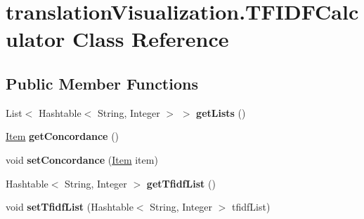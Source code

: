 \hypertarget{classtranslation_visualization_1_1_t_f_i_d_f_calculator}{}\section{translation\+Visualization.\+T\+F\+I\+D\+F\+Calculator Class Reference}
\label{classtranslation_visualization_1_1_t_f_i_d_f_calculator}
\subsection*{Public Member Functions}
\begin{DoxyCompactItemize}
\item 
\mbox{\label{classtranslation_visualization_1_1_t_f_i_d_f_calculator_a1881598c99aeace13b7922c69edda980}} 
List$<$ Hashtable$<$ String, Integer $>$ $>$ {\bfseries get\+Lists} ()
\item 
\mbox{\label{classtranslation_visualization_1_1_t_f_i_d_f_calculator_aeeeb099a394fb2cb7c935c9f544bd303}} 
\hyperlink{classtranslation_visualization_1_1_item}{Item} {\bfseries get\+Concordance} ()
\item 
\mbox{\label{classtranslation_visualization_1_1_t_f_i_d_f_calculator_ac16eeafdf9eb60f960a3a09c10368d0a}} 
void {\bfseries set\+Concordance} (\hyperlink{classtranslation_visualization_1_1_item}{Item} item)
\item 
\mbox{\label{classtranslation_visualization_1_1_t_f_i_d_f_calculator_a284d7de1902d3fef52c11e448c08dd8e}} 
Hashtable$<$ String, Integer $>$ {\bfseries get\+Tfidf\+List} ()
\item 
\mbox{\label{classtranslation_visualization_1_1_t_f_i_d_f_calculator_a79ac5963ad3479bfcccfcbf5f07ab45b}} 
void {\bfseries set\+Tfidf\+List} (Hashtable$<$ String, Integer $>$ tfidf\+List)
\item 
\mbox{\label{classtranslation_visualization_1_1_t_f_i_d_f_calculator_a3f779c17eab4b2cff9b07a097e5574e0}} 

\end{DoxyCompactItemize}
